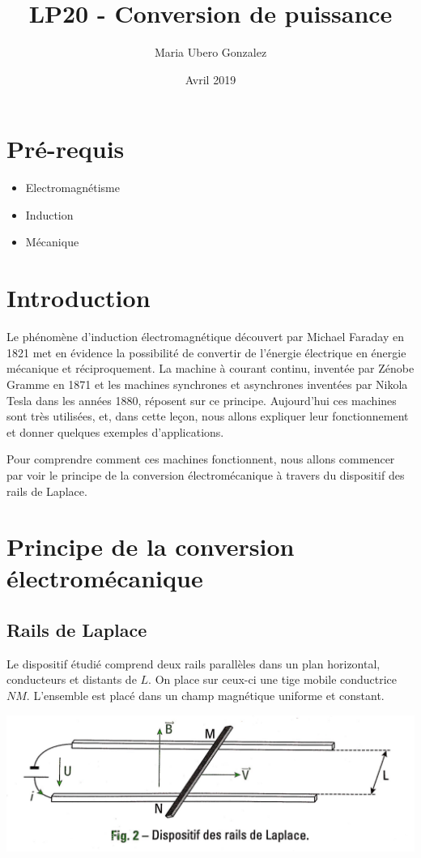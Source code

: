 \documentclass{article}
\title{LP20 - Conversion de puissance}
\author{Maria Ubero Gonzalez}
\date{Avril 2019}
\begin{document}
\maketitle

\section*{Pré-requis}
\begin{itemize}
    \item Electromagnétisme 
    \item Induction
    \item Mécanique
\end{itemize}

\tableofcontents


\section*{Introduction}
Le phénomène d'induction électromagnétique découvert par Michael Faraday en 1821 met en évidence la possibilité de convertir de l'énergie électrique en énergie mécanique et réciproquement. La machine à courant continu, inventée par Zénobe Gramme en 1871 et les machines synchrones et asynchrones inventées par Nikola Tesla dans les années 1880, réposent sur ce principe. Aujourd'hui ces machines sont très utilisées, et, dans cette leçon, nous allons expliquer leur fonctionnement et donner quelques exemples d'applications. \medskip

Pour comprendre comment ces machines fonctionnent, nous allons commencer par voir le principe de la conversion électromécanique à travers du dispositif des rails de Laplace.

\section{Principe de la conversion électromécanique}



\subsection{Rails de Laplace}

Le dispositif étudié  comprend deux rails parallèles dans un plan horizontal, conducteurs et distants de $L$. On place sur ceux-ci une tige mobile conductrice $NM$. L'ensemble est placé dans un champ magnétique uniforme et constant.

\begin{center}
    \includegraphics[scale=0.18]{railslaplace.jpg}
\end{center}
\end{document}
